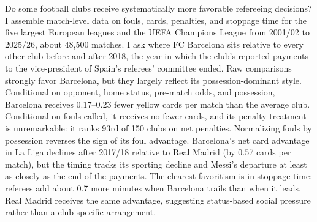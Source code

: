 Do some football clubs receive systematically more favorable refereeing decisions? I assemble match-level data on fouls, cards, penalties, and stoppage time for the five largest European leagues and the UEFA Champions League from 2001/02 to 2025/26, about 48,500 matches. I ask where FC Barcelona sits relative to every other club before and after 2018, the year in which the club's reported payments to the vice-president of Spain's referees' committee ended. Raw comparisons strongly favor Barcelona, but they largely reflect its possession-dominant style. Conditional on opponent, home status, pre-match odds, and possession, Barcelona receives 0.17--0.23 fewer yellow cards per match than the average club. Conditional on fouls called, it receives no fewer cards, and its penalty treatment is unremarkable: it ranks 93rd of 150 clubs on net penalties. Normalizing fouls by possession reverses the sign of its foul advantage. Barcelona's net card advantage in La Liga declines after 2017/18 relative to Real Madrid (by 0.57 cards per match), but the timing tracks its sporting decline and Messi's departure at least as closely as the end of the payments. The clearest favoritism is in stoppage time: referees add about 0.7 more minutes when Barcelona trails than when it leads. Real Madrid receives the same advantage, suggesting status-based social pressure rather than a club-specific arrangement.
